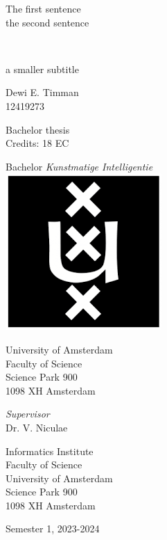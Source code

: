 \documentclass[a4paper, 12pt]{report}
\newcommand{\theTitle}{The first sentence \\
\vspace{0.5em}
the second sentence}
\newcommand{\theSubTitle}{a smaller subtitle}
\newcommand{\theAuthor}{Dewi E. Timman}
\newcommand{\theStudentID}{12419273}
\newcommand{\theSupervisor}{Dr. V. Niculae} %
\newcommand{\theInstitute}{
Informatics Institute \\ %
Faculty of Science\\
University of Amsterdam\\
Science Park 900 \\ 
1098 XH Amsterdam 
}
\newcommand{\theDate}{Semester 1, 2023-2024}
\begin{document}
\pagestyle{empty}
\begin{center}

\vspace{2.5cm}


\begin{Huge}
\theTitle
\end{Huge} \\

\vspace{0.5 cm}

\begin{Large}
\theSubTitle
\end{Large}

\vspace{1.5cm}

\theAuthor\\
\theStudentID

\vspace{1.5cm}

Bachelor thesis\\
Credits: 18 EC

\vspace{0.5cm}

Bachelor \textit{Kunstmatige Intelligentie} \\
\vspace{0.25cm}
\includegraphics[width=0.075\paperwidth]{figs/uva_logo} \\
\vspace{0.1cm}

University of Amsterdam\\
Faculty of Science\\
Science Park 900\\
1098 XH Amsterdam

\vspace{2cm}

\emph{Supervisor}\\

\theSupervisor

\vspace{0.25cm}

\theInstitute

\vspace{1.0cm}

\theDate

\end{center}
\newpage
\end{document}

